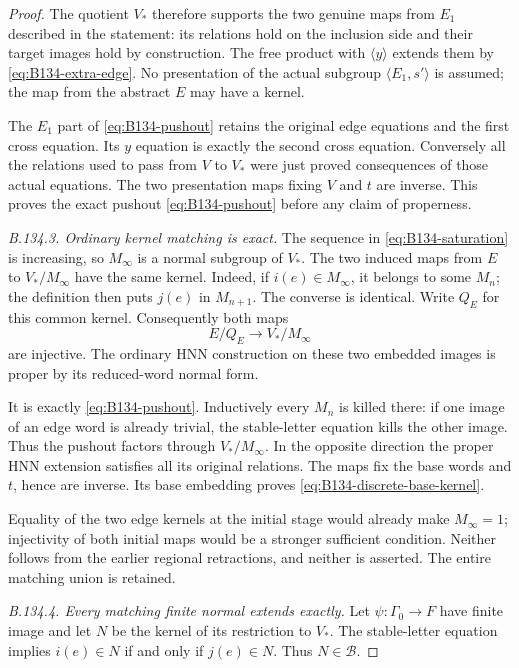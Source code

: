\begin{proof}
The quotient $V_*$ therefore supports the two genuine maps
from $E_1$ described in the statement: its relations hold on the
inclusion side and their target images hold by construction.
The free product with $\langle y\rangle$ extends them by
\eqref{eq:B134-extra-edge}. No presentation of the actual
subgroup $\langle E_1,s'\rangle$ is assumed; the map from
the abstract $E$ may have a kernel.

The $E_1$ part of \eqref{eq:B134-pushout} retains the original
edge equations and the first cross equation. Its $y$ equation
is exactly the second cross equation. Conversely all the
relations used to pass from $V$ to $V_*$ were just proved
consequences of those actual equations. The two presentation
maps fixing $V$ and $t$ are inverse. This proves the exact
pushout \eqref{eq:B134-pushout} before any claim of properness.

\emph{B.134.3. Ordinary kernel matching is exact.}
The sequence in \eqref{eq:B134-saturation} is increasing, so
$M_\infty$ is a normal subgroup of $V_*$. The two induced
maps from $E$ to $V_*/M_\infty$ have the same kernel.
Indeed, if $i(e)\in M_\infty$, it belongs to some $M_n$;
the definition then puts $j(e)$ in $M_{n+1}$. The converse
is identical. Write $Q_E$ for this common kernel.
Consequently both maps
\[
 E/Q_E\longrightarrow V_*/M_\infty
\]
are injective. The ordinary HNN construction on these two
embedded images is proper by its reduced-word normal form.

It is exactly \eqref{eq:B134-pushout}. Inductively every $M_n$
is killed there: if one image of an edge word is already trivial,
the stable-letter equation kills the other image. Thus the
pushout factors through $V_*/M_\infty$. In the opposite
direction the proper HNN extension satisfies all its original
relations. The maps fix the base words and $t$, hence are inverse.
Its base embedding proves \eqref{eq:B134-discrete-base-kernel}.

Equality of the two edge kernels at the initial stage would
already make $M_\infty=1$; injectivity of both initial maps
would be a stronger sufficient condition. Neither follows
from the earlier regional retractions, and neither is asserted.
The entire matching union is retained.

\emph{B.134.4. Every matching finite normal extends exactly.}
Let $\psi:\Gamma_0\to F$ have finite image and let $N$ be the
kernel of its restriction to $V_*$. The stable-letter equation
implies $i(e)\in N$ if and only if $j(e)\in N$. Thus
$N\in\mathcal B$.


\end{proof}
